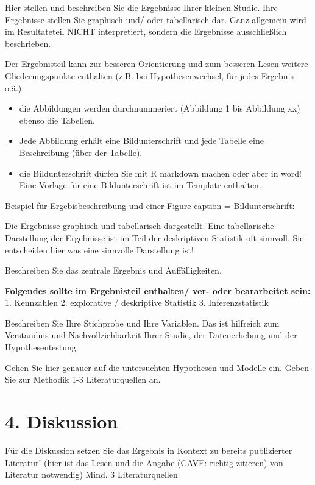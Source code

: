 \documentclass[ngerman,]{article}
\providecommand{\tightlist}{%
  \setlength{\itemsep}{0pt}\setlength{\parskip}{0pt}}
\begin{document}
Hier stellen und beschreiben Sie die Ergebnisse Ihrer kleinen Studie.
Ihre Ergebnisse stellen Sie graphisch und/ oder tabellarisch dar. Ganz
allgemein wird im Resultateteil NICHT interpretiert, sondern die
Ergebnisse ausschließlich beschrieben.

Der Ergebnisteil kann zur besseren Orientierung und zum besseren Lesen
weitere Gliederungspunkte enthalten (z.B. bei Hypothesenwechsel, für
jedes Ergebnis o.ä.).

\begin{itemize}
\tightlist
\item
  die Abbildungen werden durchnummeriert (Abbildung 1 bis Abbildung xx)
  ebenso die Tabellen.
\item
  Jede Abbildung erhält eine Bildunterschrift und jede Tabelle eine
  Beschreibung (über der Tabelle).
\item
  die Bildunterschrift dürfen Sie mit R markdown machen oder aber in
  word! Eine Vorlage für eine Bildunterschrift ist im Template
  enthalten.
\end{itemize}

Beispiel für Ergebisbeschreibung und einer Figure caption =
Bildunterschrift:

Die Ergebnisse graphisch und tabellarisch dargestellt. Eine
tabellarische Darstellung der Ergebnisse ist im Teil der deskriptiven
Statistik oft sinnvoll. Sie entscheiden hier was eine sinnvolle
Darstellung ist!

 Beschreiben Sie das zentrale Ergebnis und Auffälligkeiten.

\textbf{Folgendes sollte im Ergebnisteil enthalten/ ver- oder
beararbeitet sein: } 1. Kennzahlen 2. explorative / deskriptive
Statistik 3. Inferenzstatistik

Beschreiben Sie Ihre Stichprobe und Ihre Variablen. Das ist hilfreich
zum Verständnis und Nachvollziehbarkeit Ihrer Studie, der Datenerhebung
und der Hypothesentestung.

Gehen Sie hier genauer auf die untersuchten Hypothesen und Modelle ein.
Geben Sie zur Methodik 1-3 Literaturquellen an.

\section{4. Diskussion}\label{diskussion}

Für die Diskussion setzen Sie das Ergebnis in Kontext zu bereits
publizierter Literatur! (hier ist das Lesen und die Angabe (CAVE:
richtig zitieren) von Literatur notwendig) Mind. 3 Literaturquellen
\end{document}
